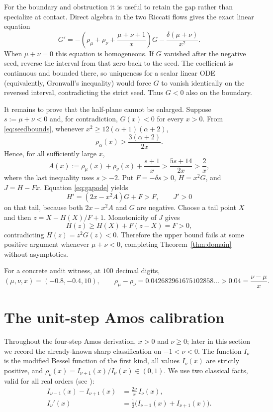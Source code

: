\documentclass[11pt]{article}
\theoremstyle{remark}
\begin{document}
For the boundary and obstruction it is useful to retain the gap rather
than specialize at contact.  Direct algebra in the two Riccati flows
gives the exact linear equation
\begin{equation}
\label{eq:gapode}
 G'=-\left(\rho_\mu+\rho_\nu+
       \frac{\mu+\nu+1}{x}\right)G
       -\frac{\delta(\mu+\nu)}{x^2}.
\end{equation}
When $\mu+\nu=0$ this equation is homogeneous.  If $G$ vanished after
the negative seed, reverse the interval from that zero back to the
seed.  The coefficient is continuous and bounded there, so uniqueness
for a scalar linear ODE (equivalently, Gronwall's inequality) would
force $G$ to vanish identically on the reversed interval, contradicting
the strict seed.  Thus $G<0$ also on the boundary.

It remains to prove that the half-plane cannot be enlarged.  Suppose
$s:=\mu+\nu<0$ and, for contradiction, $G(x)<0$ for every $x>0$.
From \eqref{eq:seedbounds}, whenever
$x^2\ge12(\alpha+1)(\alpha+2)$,
\begin{equation}
\label{eq:largelower}
 \rho_\alpha(x)>\frac{3(\alpha+2)}{2x}.
\end{equation}
Hence, for all sufficiently large $x$,
\[
 A(x):=\rho_\mu(x)+\rho_\nu(x)+\frac{s+1}{x}
 >\frac{5s+14}{2x}>\frac2x,
\]
where the last inequality uses $s>-2$.  Put
$F=-\delta s>0$, $H=x^2G$, and $J=H-Fx$.  Equation
\eqref{eq:gapode} yields
\[
 H'=(2x-x^2A)G+F>F,
 \qquad J'>0
\]
on that tail, because both $2x-x^2A$ and $G$ are negative.  Choose a
tail point $X$ and then $z=X-H(X)/F+1$.  Monotonicity of $J$ gives
\[
 H(z)\ge H(X)+F(z-X)=F>0,
\]
contradicting $H(z)=z^2G(z)<0$.  Therefore the upper bound fails at
some positive argument whenever $\mu+\nu<0$, completing
Theorem~\ref{thm:domain} without asymptotics.

For a concrete audit witness, at $100$ decimal digits,
\[
 (\mu,\nu,x)=(-0.8,-0.4,10),\qquad
 \rho_\mu-\rho_\nu=0.042682961675102858\ldots>0.04=\frac{\nu-\mu}{x}.
\]

\section{The unit-step Amos calibration}
\label{sec:unitstep}

Throughout the four-step Amos derivation, $x>0$ and $\nu \ge 0$; later in
this section we record the already-known sharp classification on
$-1<\nu<0$.  The function $I_\nu$ is the modified Bessel function
of the first kind, all values $I_\nu(x)$ are strictly positive, and
$\rho_\nu(x) = I_{\nu+1}(x)/I_\nu(x) \in (0,1)$. We use two classical
facts, valid for all real orders (see \cite[10.29.1--10.29.2]{DLMF}):
\begin{align}
I_{\nu-1}(x) - I_{\nu+1}(x) &= \frac{2\nu}{x}\, I_\nu(x),
\label{eq:recurrence}\\
I_\nu'(x) &= \tfrac12\bigl(I_{\nu-1}(x) + I_{\nu+1}(x)\bigr).
\label{eq:derivative}
\end{align}
\end{document}
